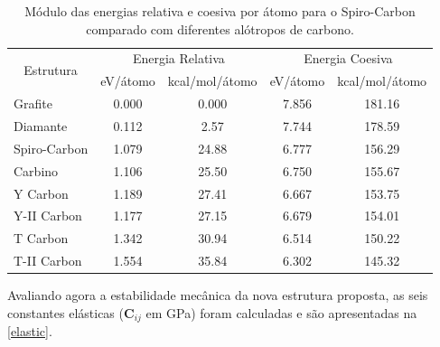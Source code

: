 	\begin{table}[ht]
		\centering
		\renewcommand{\arraystretch}{1.1}
		\caption{Módulo das energias relativa e coesiva por átomo para o Spiro-Carbon comparado com diferentes alótropos de carbono.}
		\label{energy}
		\begin{tabular}{lcccc}
			\hline
			\hline
			\multicolumn{1}{c}{\multirow{2}{*}{Estrutura}} & \multicolumn{2}{c}{Energia Relativa} & \multicolumn{2}{c}{Energia Coesiva}                             \\ \cline{2-5} 
			\multicolumn{1}{c}{}                           & \multicolumn{1}{l}{eV/átomo} & \multicolumn{1}{l}{kcal/mol/átomo} & \multicolumn{1}{l}{eV/átomo} & \multicolumn{1}{l}{kcal/mol/átomo} \\ \hline
				Grafite      & 0.000  & 0.000  & 7.856  & 181.16  \\
				Diamante     & 0.112  & 2.57   & 7.744  & 178.59  \\
				Spiro-Carbon & 1.079  & 24.88  & 6.777  & 156.29  \\
				Carbino      & 1.106  & 25.50  & 6.750  & 155.67  \\
				Y Carbon     & 1.189  & 27.41  & 6.667  & 153.75  \\
				Y-II Carbon  & 1.177  & 27.15  & 6.679  & 154.01  \\
				T Carbon     & 1.342  & 30.94  & 6.514  & 150.22  \\
				T-II Carbon  & 1.554  & 35.84  & 6.302  & 145.32  \\ \hline \hline
		\end{tabular}
	\end{table}
	
	
	Avaliando agora a estabilidade mecânica da nova estrutura proposta, as seis constantes elásticas ($\textbf{C}_{ij}$ em GPa) foram calculadas e são apresentadas na \autoref{elastic}.
	
